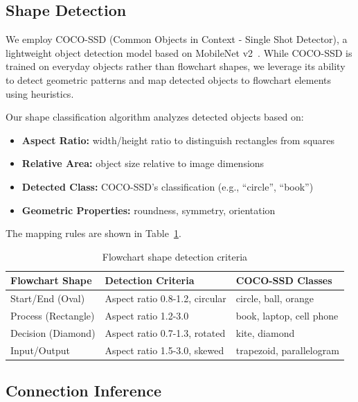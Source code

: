 \documentclass[11pt,a4paper]{article}
\begin{document}
\subsection{Shape Detection}

We employ COCO-SSD (Common Objects in Context - Single Shot Detector), a lightweight object detection model based on MobileNet v2~\cite{howard2017mobilenets}. While COCO-SSD is trained on everyday objects rather than flowchart shapes, we leverage its ability to detect geometric patterns and map detected objects to flowchart elements using heuristics.

Our shape classification algorithm analyzes detected objects based on:

\begin{itemize}[leftmargin=*]
    \item \textbf{Aspect Ratio:} width/height ratio to distinguish rectangles from squares
    \item \textbf{Relative Area:} object size relative to image dimensions
    \item \textbf{Detected Class:} COCO-SSD's classification (e.g., ``circle'', ``book'')
    \item \textbf{Geometric Properties:} roundness, symmetry, orientation
\end{itemize}

The mapping rules are shown in Table~\ref{tab:shape-mapping}.

\begin{table}[h]
\centering
\caption{Flowchart shape detection criteria}
\label{tab:shape-mapping}
\begin{tabular}{@{}lll@{}}
\toprule
\textbf{Flowchart Shape} & \textbf{Detection Criteria} & \textbf{COCO-SSD Classes} \\
\midrule
Start/End (Oval) & Aspect ratio 0.8-1.2, circular & circle, ball, orange \\
Process (Rectangle) & Aspect ratio 1.2-3.0 & book, laptop, cell phone \\
Decision (Diamond) & Aspect ratio 0.7-1.3, rotated & kite, diamond \\
Input/Output & Aspect ratio 1.5-3.0, skewed & trapezoid, parallelogram \\
\bottomrule
\end{tabular}
\end{table}

\subsection{Connection Inference}
\end{document}
